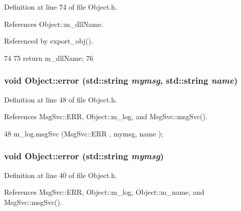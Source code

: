 Definition at line 74 of file Object.h.

References Object::m\_\-dllName.

Referenced by export\_\-obj().


\begin{DoxyCode}
74                        {
75     return m_dllName;
76   }  
\end{DoxyCode}
\hypertarget{classObject_ad7f6c457733082efa2f9ff5f5c8e119a}{
\subsubsection[{error}]{\setlength{\rightskip}{0pt plus 5cm}void Object::error (std::string {\em mymsg}, \/  std::string {\em name})}}
\label{classObject_ad7f6c457733082efa2f9ff5f5c8e119a}


Definition at line 48 of file Object.h.

References MsgSvc::ERR, Object::m\_\-log, and MsgSvc::msgSvc().


\begin{DoxyCode}
48 { m_log.msgSvc (MsgSvc::ERR     , mymsg, name ); }
\end{DoxyCode}
\hypertarget{classObject_a204a95f57818c0f811933917a30eff45}{
\subsubsection[{error}]{\setlength{\rightskip}{0pt plus 5cm}void Object::error (std::string {\em mymsg})}}
\label{classObject_a204a95f57818c0f811933917a30eff45}


Definition at line 40 of file Object.h.

References MsgSvc::ERR, Object::m\_\-log, Object::m\_\-name, and MsgSvc::msgSvc().


